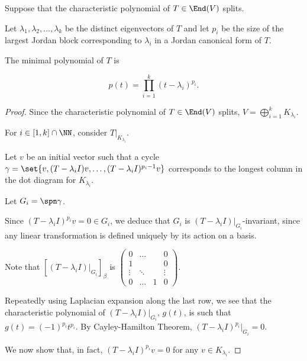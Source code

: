 \documentclass[11pt]{scrartcl}
\begin{document}
\begin{theorem*}
  \hfill

  Suppose that the characteristic polynomial of $T \in \End(V)$ splits. 

  Let $\lambda_1, \lambda_2, \dots, \lambda_k$ be the distinct
  eigenvectors of $T$ and let $p_i$ be the size of the largest Jordan
  block corresponding to $\lambda_i$ in a Jordan canonical form of
  $T$.

  The minimal polynomial of $T$ is

  \begin{equation*}
    p(t) = \prod_{i=1}^k(t-\lambda_i)^{p_i}.
  \end{equation*}

\end{theorem*}

\begin{proof}
  \hfill

  Since the characteristic polynomial of $T \in \End(V)$ splits, $V = \bigoplus_{i=1}^k K_{\lambda_i}$.

  For $i\in[1, k]\cap \NN$, consider $T|_{K_{\lambda_i}}$.


  Let $v$ be an initial vector such that a cycle
  $\gamma = \set{v, (T-\lambda_iI)v, \dots, (T-\lambda_iI)^{p_i-1}v}$
  corresponds to the longest column in the dot diagram for
  $K_{\lambda_i}$.

  Let $G_i = \spn \gamma$.  

  Since $(T-\lambda_i I)^{p_i}v = 0 \in G_i$, we deduce that $G_i$ is
  $(T-\lambda_iI)|_{G_i}$-invariant, since any linear transformation is defined
  uniquely by its action on a basis.

  Note that $[(T-\lambda_iI)|_{G_{i}}]_{\beta}$ is $
  \begin{pmatrix}
    0 & \dots & & 0\\
    1 & & & 0\\
    \vdots &\ddots & & \vdots\\
    0 &\dots & 1 & 0
  \end{pmatrix}
  $. 

  Repeatedly using Laplacian expansion along the last row, we see that
  the characteristic polynomial of $(T-\lambda_i I)|_{G_i}$, $g(t)$,
  is such that $g(t) = (-1)^{p_i}t^{p_i}$. By Cayley-Hamilton Theorem,
  $(T-\lambda_i I)^{p_i}|_{G_i} = 0$.

  We now show that, in fact, $(T-\lambda_i I)^{p_i} v= 0$ for any
  $v\in K_{\lambda_i}$.


\end{proof}
\end{document}
